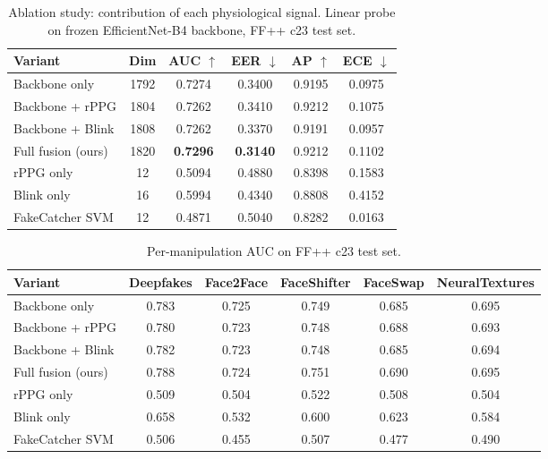 \begin{table}[htbp]
\centering
\caption{Ablation study: contribution of each physiological signal. Linear probe on frozen EfficientNet-B4 backbone, FF++ c23 test set.}
\label{tab:ablation}
\begin{tabular}{lccccc}
\toprule
Variant & Dim & AUC $\uparrow$ & EER $\downarrow$ & AP $\uparrow$ & ECE $\downarrow$ \\
\midrule
Backbone only & 1792 & 0.7274 & 0.3400 & 0.9195 & 0.0975 \\
Backbone + rPPG & 1804 & 0.7262 & 0.3410 & 0.9212 & 0.1075 \\
Backbone + Blink & 1808 & 0.7262 & 0.3370 & 0.9191 & 0.0957 \\
Full fusion (ours) & 1820 & \textbf{0.7296} & \textbf{0.3140} & 0.9212 & 0.1102 \\
rPPG only & 12 & 0.5094 & 0.4880 & 0.8398 & 0.1583 \\
Blink only & 16 & 0.5994 & 0.4340 & 0.8808 & 0.4152 \\
FakeCatcher SVM & 12 & 0.4871 & 0.5040 & 0.8282 & 0.0163 \\
\bottomrule
\end{tabular}
\end{table}

\begin{table}[htbp]
\centering
\caption{Per-manipulation AUC on FF++ c23 test set.}
\label{tab:per_manip}
\begin{tabular}{lccccc}
\toprule
Variant & Deepfakes & Face2Face & FaceShifter & FaceSwap & NeuralTextures \\
\midrule
Backbone only & 0.783 & 0.725 & 0.749 & 0.685 & 0.695 \\
Backbone + rPPG & 0.780 & 0.723 & 0.748 & 0.688 & 0.693 \\
Backbone + Blink & 0.782 & 0.723 & 0.748 & 0.685 & 0.694 \\
Full fusion (ours) & 0.788 & 0.724 & 0.751 & 0.690 & 0.695 \\
rPPG only & 0.509 & 0.504 & 0.522 & 0.508 & 0.504 \\
Blink only & 0.658 & 0.532 & 0.600 & 0.623 & 0.584 \\
FakeCatcher SVM & 0.506 & 0.455 & 0.507 & 0.477 & 0.490 \\
\bottomrule
\end{tabular}
\end{table}